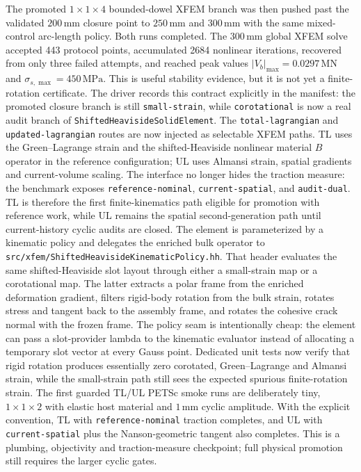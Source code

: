 The promoted \(1\times1\times4\) bounded-dowel XFEM branch was then pushed
past the validated \(200\,\mathrm{mm}\) closure point to \(250\,\mathrm{mm}\)
and \(300\,\mathrm{mm}\) with the same mixed-control arc-length policy.  Both
runs completed.  The \(300\,\mathrm{mm}\) global XFEM solve accepted 443
protocol points, accumulated 2684 nonlinear iterations, recovered from only
three failed attempts, and reached peak values
\(|V_b|_{\max}=0.0297\,\mathrm{MN}\) and
\(\sigma_{s,\max}=450\,\mathrm{MPa}\).  This is useful stability evidence, but
it is not yet a finite-rotation certificate.  The driver records this contract
explicitly in the manifest: the promoted closure branch is still
\texttt{small-strain}, while \texttt{corotational} is now a real audit branch
of \texttt{ShiftedHeavisideSolidElement}.  The
\texttt{total-lagrangian} and \texttt{updated-lagrangian} routes are now
injected as selectable XFEM paths.  TL uses the
Green--Lagrange strain and the shifted-Heaviside nonlinear material \(B\)
operator in the reference configuration; UL uses Almansi strain, spatial
gradients and current-volume scaling.  The interface no longer hides the
traction measure: the benchmark exposes \texttt{reference-nominal},
\texttt{current-spatial}, and \texttt{audit-dual}.  TL is therefore the first
finite-kinematics path eligible for promotion with reference work, while UL
remains the spatial second-generation path until current-history cyclic audits
are closed.  The
element is parameterized by a
kinematic policy and delegates the enriched bulk operator to
\texttt{src/xfem/ShiftedHeavisideKinematicPolicy.hh}.  That header evaluates
the same shifted-Heaviside slot layout through either a small-strain map or a
corotational map.  The latter extracts a polar frame from the enriched
deformation gradient, filters rigid-body rotation from the bulk strain, rotates
stress and tangent back to the assembly frame, and rotates the cohesive crack
normal with the frozen frame.  The policy seam is intentionally cheap: the
element can pass a slot-provider lambda to the kinematic evaluator instead of
allocating a temporary slot vector at every Gauss point.  Dedicated unit tests
now verify that rigid rotation produces essentially zero corotated,
Green--Lagrange and Almansi strain, while the small-strain path still sees the
expected spurious finite-rotation strain.  The first guarded TL/UL PETSc smoke
runs are deliberately tiny, \(1\times1\times2\) with elastic host material and
\(1\,\mathrm{mm}\) cyclic amplitude.  With the explicit convention, TL with
\texttt{reference-nominal} traction completes, and UL with
\texttt{current-spatial} plus the Nanson-geometric tangent also completes.
This is a plumbing, objectivity and traction-measure checkpoint; full physical
promotion still requires the larger cyclic gates.

